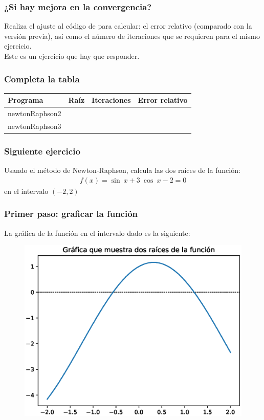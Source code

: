 \begin{frame}
\frametitle{¿Si hay mejora en la convergencia?}
Realiza el ajuste al código de \python{} para calcular: el error relativo (comparado con la versión previa), así como el número de iteraciones que se requieren para el mismo ejercicio.
\\
\bigskip
Este es un ejercicio que hay que responder.
\end{frame}
\begin{frame}
\frametitle{Completa la tabla}
\begin{table}
	\centering
	\begin{tabular}{l | l | l | l}
		Programa & Raíz & Iteraciones & Error relativo \\ \hline
		newtonRaphson2 & & & \\ \hline
		newtonRaphson3 & & & \\ \hline
	\end{tabular}
\end{table}
\end{frame}
\begin{frame}
\frametitle{Siguiente ejercicio}
Usando el método de Newton-Raphson, calcula las dos raíces de la función:
\begin{align*}
f(x) = \sin \: x + 3 \: \cos \: x - 2 = 0
\end{align*}
en el intervalo $(-2, 2)$
\end{frame}
\begin{frame}
\frametitle{Primer paso: graficar la función}
La gráfica de la función en el intervalo dado es la siguiente:
\begin{figure}
	\centering
	\includegraphics[scale=0.5]{Imagenes/Ejercicio_NR_Seno_01.eps}
\end{figure}
\end{frame}
